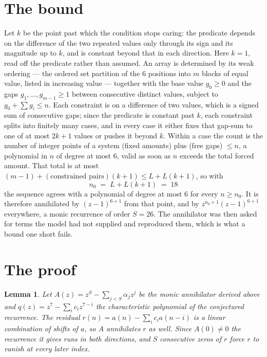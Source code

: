 \documentclass[11pt,a4paper]{article}
\theoremstyle{plain}
\newtheorem{lemma}[theorem]{Lemma}
\theoremstyle{definition}
\begin{document}
\section{The bound}

Let $k$ be the point past which the condition stops caring: the predicate depends on the
difference of the two repeated values only through its sign and its magnitude up to $k$, and is
constant beyond that in each direction. Here $k=1$, read off the predicate rather than
assumed. An array is determined by its weak ordering --- the ordered set partition of the
$6$ positions into $m$ blocks of equal value, listed in increasing value --- together with
the base value $g_0\ge0$ and the gaps $g_1,\dots,g_{m-1}\ge1$ between consecutive distinct
values, subject to $g_0+\sum g_i\le n$. Each constraint is on a difference of two values, which
is a signed sum of consecutive gaps; since the predicate is constant past $k$, each constraint
splits into finitely many cases, and in every case it either fixes that gap-sum to one of at
most $2k+1$ values or pushes it beyond $k$. Within a case the count is the number of integer
points of a system (fixed amounts) plus (free gaps) $\le n$, a polynomial in $n$ of degree at
most $6$, valid as soon as $n$ exceeds the total forced amount. That total is at most
$(m-1)+(\text{constrained pairs})(k+1)\le L+L(k+1)$, so with
\[
n_0 \;=\; L + L(k+1) \;=\; 18
\]
the sequence agrees with a polynomial of degree at most $6$ for every $n\ge n_0$. It is
therefore annihilated by $(z-1)^{6+1}$ from that point, and by $z^{n_0+1}(z-1)^{6+1}$
everywhere, a monic recurrence of order $S=26$. The annihilator was then asked for terms the
model had not supplied and reproduced them, which is what a bound one short fails.

\section{The proof}

\begin{lemma}\label{lem:crit}
Let $A(z)=z^S-\sum_{j<S}\alpha_jz^{j}$ be the monic annihilator derived above and
$q(z)=z^{7}-\sum_ic_iz^{7-i}$ the characteristic polynomial of the conjectured
recurrence. The residual $r(n)=a(n)-\sum_ic_ia(n-i)$ is a linear combination of shifts of $a$,
so $A$ annihilates $r$ as well. Since $A(0)\ne0$ the recurrence it gives runs in both
directions, and $S$ consecutive zeros of $r$ force $r$ to vanish at every later index.
\end{lemma}
\end{document}
